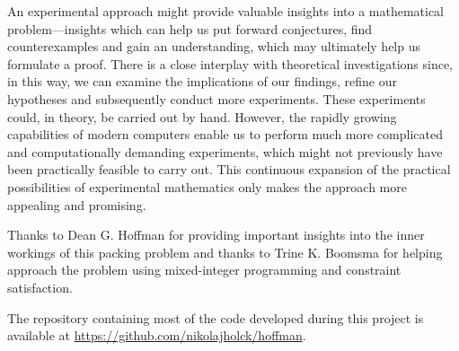 An experimental approach might provide valuable insights into a mathematical problem---insights which can help us put forward conjectures, find counterexamples and gain an understanding, which may ultimately help us formulate a proof. There is a close interplay with theoretical investigations since, in this way, we can examine the implications of our findings, refine our hypotheses and subsequently conduct more experiments. These experiments could, in theory, be carried out by hand. However, the rapidly growing capabilities of modern computers enable us to perform much more complicated and computationally demanding experiments, which might not previously have been practically feasible to carry out. This continuous expansion of the practical possibilities of experimental mathematics only makes the approach more appealing and promising.

Thanks to Dean G. Hoffman for providing important insights into the inner workings of this packing problem and thanks to Trine K. Boomsma for helping approach the problem using mixed-integer programming and constraint satisfaction.

The repository containing most of the code developed during this project is available at \url{https://github.com/nikolajholck/hoffman}.

